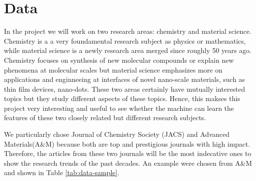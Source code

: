 \documentclass[conference]{IEEEtran}
\begin{document}
%




\section{Data}
In the project we will work on two research areas: chemistry and material science. Chemistry is a a very foundamental research subject as physics or mathematics, while material science is a newly research area merged since roughly 50 years ago. Chemistry focuses on synthesis of new molecular compounds or explain new phenomena at molecular scales but material science emphasizes more on applications and enginneeing at interfaces of novel nano-scale materials, such as thin film devices, nano-dots. These two areas certainly have mutually interested topics but they study different aspects of these topics. Hence, this makses this project very interesting and useful to see whether the machine can learn the features of these two closely related but different research subjects.

We particularly chose Journal of Chemistry Society (JACS) and Advanced Materials(A\&M) because both are top and prestigious journals with high impact. Therefore, the articles from these two journals will be the most indecative ones to show the research trends of the past decades. An example were chosen from A\&M and shown in Table \ref{tab:data-sample}.
\end{document}
